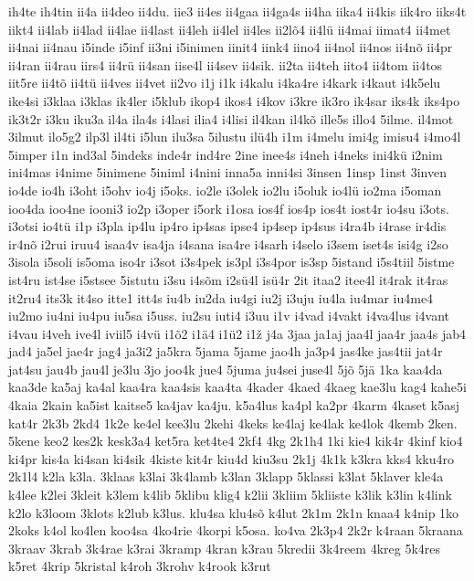 {ih4te
ih4tin
ii4a
ii4deo
ii4du.
iie3
ii4es
ii4gaa
ii4ga4s
ii4ha
iika4
ii4kis
iik4ro
iiks4t
iikt4
ii4lab
ii4lad
ii4lae
ii4last
ii4leh
ii4lel
ii4les
ii2lõ4
ii4lü
ii4mai
iimat4
ii4met
ii4nai
ii4nau
i5inde
i5inf
ii3ni
i5inimen
iinit4
iink4
iino4
ii4nol
ii4nos
ii4nõ
ii4pr
ii4ran
ii4rau
iirs4
ii4rü
ii4san
iise4l
ii4sev
ii4sik.
ii2ta
ii4teh
iito4
ii4tom
ii4tos
iit5re
ii4tõ
ii4tü
ii4ves
ii4vet
ii2vo
i1j
i1k
i4kalu
i4ka4re
i4kark
i4kaut
i4k5elu
ike4si
i3klaa
i3klas
ik4ler
i5klub
ikop4
ikos4
i4kov
i3kre
ik3ro
ik4sar
iks4k
iks4po
ik3t2r
i3ku
iku3a
il4a
ila4s
i4lasi
ilia4
i4lisi
il4kan
il4kõ
ille5s
illo4
5ilme.
il4mot
3ilmut
ilo5g2
ilp3l
il4ti
i5lun
ilu3sa
5ilustu
ilü4h
i1m
i4melu
imi4g
imisu4
i4mo4l
5imper
i1n
ind3al
5indeks
inde4r
ind4re
2ine
inee4s
i4neh
i4neks
ini4kü
i2nim
ini4mas
i4nime
5inimene
5iniml
i4nini
inna5a
inni4si
3insen
1insp
1inst
3inven
io4de
io4h
i3oht
i5ohv
io4j
i5oks.
io2le
i3olek
io2lu
i5oluk
io4lü
io2ma
i5oman
ioo4da
ioo4ne
iooni3
io2p
i3oper
i5ork
i1osa
ios4f
ios4p
ios4t
iost4r
io4su
i3ots.
i3otsi
io4tü
i1p
i3pla
ip4lu
ip4ro
ip4sas
ipse4
ip4sep
ip4sus
i4ra4b
i4rase
ir4dis
ir4nõ
i2rui
iruu4
isaa4v
isa4ja
i4sana
isa4re
i4sarh
i4selo
i3sem
iset4s
isi4g
i2so
3isola
i5soli
is5oma
iso4r
i3sot
i3s4pek
is3pl
i3s4por
is3sp
5istand
i5s4tiil
5istme
ist4ru
ist4se
i5stsee
5istutu
i3su
i4sõm
i2sü4l
isü4r
2it
itaa2
itee4l
it4rak
it4ras
it2ru4
its3k
it4so
itte1
itt4s
iu4b
iu2da
iu4gi
iu2j
i3uju
iu4la
iu4mar
iu4me4
iu2mo
iu4ni
iu4pu
iu5sa
i5uss.
iu2su
iuti4
i3uu
i1v
i4vad
i4vakt
i4va4lus
i4vant
i4vau
i4veh
ive4l
iviil5
i4vü
i1õ2
i1ä4
i1ü2
i1ž
j4a
3jaa
ja1aj
jaa4l
jaa4r
jaa4s
jab4
jad4
ja5el
jae4r
jag4
ja3i2
ja5kra
5jama
5jame
jao4h
ja3p4
jas4ke
jas4tii
jat4r
jat4su
jau4b
jau4l
je3lu
3jo
joo4k
jue4
5juma
ju4sei
juse4l
5jõ
5jä
1ka
kaa4da
kaa3de
ka5aj
ka4al
kaa4ra
kaa4sis
kaa4ta
4kader
4kaed
4kaeg
kae3lu
kag4
kahe5i
4kaia
2kain
ka5ist
kaitse5
ka4jav
ka4ju.
k5a4lus
ka4pl
ka2pr
4karm
4kaset
k5asj
kat4r
2k3b
2kd4
1k2e
ke4el
kee3lu
2kehi
4keks
ke4laj
ke4lak
ke4lok
4kemb
2ken.
5kene
keo2
kes2k
kesk3a4
ket5ra
ket4te4
2kf4
4kg
2k1h4
1ki
kie4
kik4r
4kinf
kio4
ki4pr
kis4a
ki4san
ki4sik
4kiste
kit4r
kiu4d
kiu3su
2k1j
4k1k
k3kra
kks4
kku4ro
2k1l4
k2la
k3la.
3klaas
k3lai
3k4lamb
k3lan
3klapp
5klassi
k3lat
5klaver
kle4a
k4lee
k2lei
3kleit
k3lem
k4lib
5klibu
klig4
k2lii
3kliim
5kliiste
k3lik
k3lin
k4link
k2lo
k3loom
3klots
k2lub
k3lus.
klu4sa
klu4sõ
k4lut
2k1m
2k1n
knaa4
k4nip
1ko
2koks
k4ol
ko4len
koo4sa
4ko4rie
4korpi
k5osa.
ko4va
2k3p4
2k2r
k4raan
5kraana
3kraav
3krab
3k4rae
k3rai
3kramp
4kran
k3rau
5kredii
3k4reem
4kreg
5k4res
k5ret
4krip
5kristal
k4roh
3krohv
k4rook
k3rut
}
